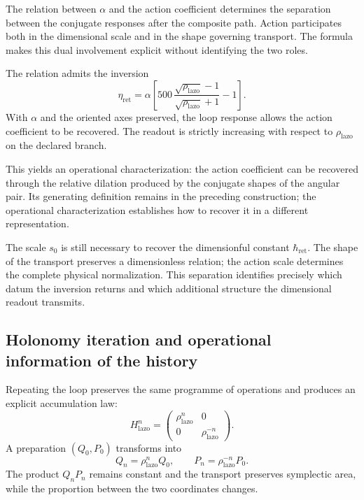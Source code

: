 The relation between $\alpha$ and the action coefficient determines the
separation between the conjugate responses after the composite
path. Action participates both in the dimensional scale and in
the shape governing transport. The formula makes this
dual involvement explicit without identifying the two roles.

The relation admits the inversion
\begin{equation}
 \boxed{
 \eta_{\mathrm{ret}}=
 \alpha\left[
 500\,\frac{\sqrt{\rho_{\mathrm{lazo}}}-1}
               {\sqrt{\rho_{\mathrm{lazo}}}+1}-1\right].}
 \label{eq:narrativa-inversa-accion}
\end{equation}
With $\alpha$ and the oriented axes preserved, the loop response
allows the action coefficient to be recovered. The readout is strictly
increasing with respect to $\rho_{\mathrm{lazo}}$ on the declared branch.

This yields an operational characterization: the action coefficient
can be recovered through the relative dilation produced by the
conjugate shapes of the angular pair. Its generating definition remains
in the preceding construction; the operational characterization establishes
how to recover it in a different representation.

The scale $s_0$ is still necessary to recover the dimensionful
constant $\hbar_{\mathrm{ret}}$. The shape of the transport preserves
a dimensionless relation; the action scale determines the
complete physical normalization. This separation identifies precisely
which datum the inversion returns and which additional structure the
dimensional readout transmits.

\subsection{Holonomy iteration and operational information of the history}
\label{subsec:narrativa-informacion-operacional}

Repeating the loop preserves the same programme of operations and
produces an explicit accumulation law:
\begin{equation}
 H_{\mathrm{lazo}}^n=
 \begin{pmatrix}\rho_{\mathrm{lazo}}^n&0\\
                 0&\rho_{\mathrm{lazo}}^{-n}\end{pmatrix}.
 \label{eq:narrativa-iteracion-lazo}
\end{equation}
A preparation $(Q_0,P_0)$ transforms into
\begin{equation}
 Q_n=\rho_{\mathrm{lazo}}^nQ_0,
 \qquad
 P_n=\rho_{\mathrm{lazo}}^{-n}P_0.
 \label{eq:narrativa-iteracion-estado}
\end{equation}
The product $Q_nP_n$ remains constant and the transport preserves
symplectic area, while the proportion between the two coordinates
changes.

